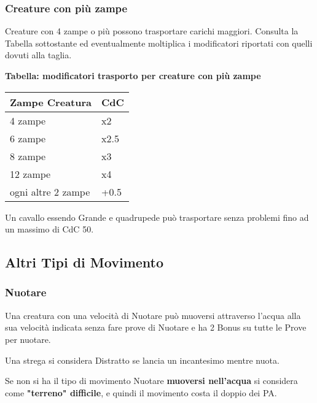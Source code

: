\documentclass[12pt,a4paper,twoside,openany]{book}
\begin{document}
\begin{multicols}{2}
\medskip

\subsubsection{Creature con più zampe}

Creature con 4 zampe o più possono trasportare carichi maggiori. Consulta la Tabella sottostante ed eventualmente moltiplica i modificatori riportati con quelli dovuti alla taglia.


\textbf{Tabella: modificatori trasporto per creature con più zampe}

\medskip

\begin{tabularx}{0.45\textwidth}{ll}
\textbf{Zampe Creatura}&\textbf{CdC}\\
\toprule
4 zampe & x2\\
6 zampe & x2.5\\
8 zampe & x3\\
12 zampe & x4\\
ogni altre 2 zampe & +0.5\\
\end{tabularx}

\medskip

Un cavallo essendo Grande e quadrupede può trasportare senza problemi fino ad un massimo di CdC 50.

\subsection{Altri Tipi di Movimento}

\label{altri-tipi-di-movimento}

\subsubsection{Nuotare}\label{nuotare}

Una creatura con una velocità di Nuotare può muoversi attraverso l'acqua alla sua velocità indicata senza fare prove di Nuotare e ha 2 Bonus su tutte le Prove per nuotare.

Una strega si considera Distratto se lancia un incantesimo mentre nuota.

Se non si ha il tipo di movimento Nuotare \textbf{muoversi nell'acqua} si considera come \textbf{"terreno" difficile}, e quindi il movimento costa il doppio dei PA.


\end{multicols}
\end{document}

